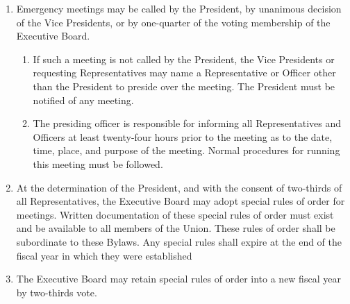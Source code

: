 \begin{enumerate}
\begin{enumerate}
  \item In the event of a vacancy or extended absence of the Director, the President shall ask a member of the Union administrative staff to fulfill this responsibility.
  \item The President may remove any person who is disrupting a meeting.
    \begin{enumerate}
    \item The President’s decision may be overruled by the objection of any Representative.
    \end{enumerate}
  \item At any time, any member of the Executive Board may call for a vote to remove a person from a meeting. This requires a two-thirds vote of the Board and, if successful, cannot be overruled.
  \end{enumerate}
\item Emergency meetings may be called by the President, by unanimous decision of the Vice Presidents, or by one-quarter of the voting membership of the Executive Board.
  \begin{enumerate}
  \item If such a meeting is not called by the President, the Vice Presidents or requesting Representatives may name a Representative or Officer other than the President to preside over the meeting. The President must be notified of any meeting.
  \item The presiding officer is responsible for informing all Representatives and Officers at least twenty-four hours prior to the meeting as to the date, time, place, and purpose of the meeting. Normal procedures for running this meeting must be followed.
  \end{enumerate}
\item At the determination of the President, and with the consent of two-thirds of all Representatives, the Executive Board may adopt special rules of order for meetings. Written documentation of these special rules of order must exist and be available to all members of the Union. These rules of order shall be subordinate to these Bylaws. Any special rules shall expire at the end of the fiscal year in which they were established
\item The Executive Board may retain special rules of order into a new fiscal year by two-thirds vote.
\end{enumerate}


